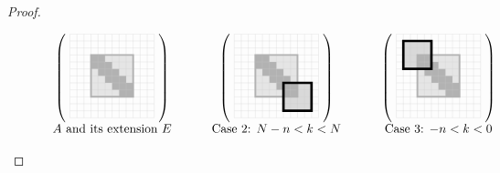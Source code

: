 \documentclass[preprint,1p,11pt]{elsarticle}
\numberwithin{equation}{section}   %
\numberwithin{figure}{section}  %
\begin{document}
\begin{proof}
\begin{figure}[t]
\[
\begin{tabular}{cp{3mm}cp{3mm}c}
$
\begin{pmatrix}~
\begin{tikzpicture}[scale=0.4]
\fill[gray!20] (1.5,4.5) rectangle ++(3,-3);
\foreach \k in {1.5,2,...,3.5}
  \fill[gray!60] (\k,6-\k) rectangle ++(1.0,-1.0);
\draw[gray!40,very thin,step=0.5cm] (0,0) grid (6,6);
\draw[black!30,line width=0.5mm] (1.5,4.5) rectangle ++(3,-3);
\end{tikzpicture}
~\end{pmatrix}
$
&&
$
\begin{pmatrix}~
\begin{tikzpicture}[scale=0.4]
\fill[gray!20] (1.5,4.5) rectangle ++(3,-3);
\fill[gray!30] (3.5,2.5) rectangle ++(2,-2);
\foreach \k in {1.5,2,...,3.5}
  \fill[gray!60] (\k,6-\k) rectangle ++(1.0,-1.0);
\draw[gray!40,very thin,step=0.5cm] (0,0) grid (6,6);
\draw[black!30,line width=0.5mm] (1.5,4.5) rectangle ++(3,-3);
\draw[black,line width=0.7mm] (3.5,2.5) rectangle ++(2,-2);
\end{tikzpicture}
~\end{pmatrix}
$
&&
$
\begin{pmatrix}~
\begin{tikzpicture}[scale=0.4]
\fill[gray!20] (1.5,4.5) rectangle ++(3,-3);
\fill[gray!30] (0.5,5.5) rectangle ++(2,-2);
\foreach \k in {1.5,2,...,3.5}
  \fill[gray!60] (\k,6-\k) rectangle ++(1.0,-1.0);
\draw[gray!40,very thin,step=0.5cm] (0,0) grid (6,6);
\draw[black!30,line width=0.5mm] (1.5,4.5) rectangle ++(3,-3);
\draw[black,line width=0.7mm] (0.5,5.5) rectangle ++(2,-2);
\end{tikzpicture}
~\end{pmatrix}
$
\\
$A$ and its extension $E$ &&
Case 2: $N-n<k<N$ && Case 3: $-n<k<0$
\end{tabular}
\]

\vspace{-3ex}


\end{figure}
\end{proof}
\end{document}
